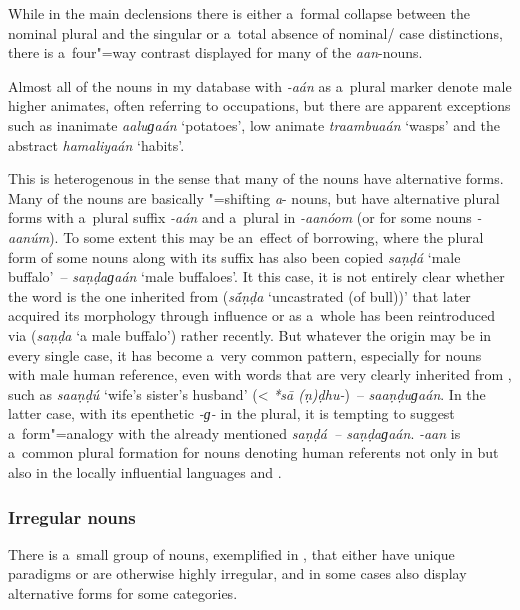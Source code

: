While in the main declensions there is either a~formal collapse between the nominal plural and the  singular or a~total absence of nominal/ case distinctions, there is a~four"=way contrast displayed for many of the \textit{aan}-nouns.


Almost all of the nouns in my database with \textit{-aán} as a~plural marker denote male higher animates, often referring to occupations, but there are apparent exceptions such as inanimate \textit{aaluɡaán} `potatoes', low animate \textit{traambuaán} `wasps' and the abstract  \textit{hamaliyaán} `habits'.


This  is heterogenous in the sense that many of the nouns have alternative forms. Many of
the nouns are basically "=shifting \textit{a}- nouns, but have alternative plural
forms with a~plural suffix \textit{-aán} and a~plural  in
\textit{-aanóom} (or for some nouns \textit{-aanúm}). To some extent
this may be an~effect of borrowing, where the plural form of some  nouns along with its suffix
has also been copied \textit{saṇḍá} `male buffalo'~-- \textit{saṇḍaɡaán} `male
buffaloes'. It this case, it is not entirely clear whether the word is the one inherited from 
(\textit{s\'{\={a}}ṇḍa} `uncastrated (of bull))' that later acquired its morphology through 
influence or as a~whole has been reintroduced via  (\textit{saṇḍa} `a male buffalo') rather
recently. But whatever the origin may be in every single case, it has become a~very common pattern,
especially for nouns with male human reference, even with words that are very clearly inherited from
, such as \textit{saaṇḍú} `wife's sister's husband' ({\textless} \textit{*s\={a}\'{
  }(ṇ)ḍhu-})~-- \textit{saaṇḍuɡaán}. In the latter case, with its epenthetic
\textit{-ɡ-} in the plural, it is tempting to suggest a~form"=analogy with the already
mentioned \textit{saṇḍá~-- saṇḍaɡaán}. \textit{-aan} is a~common plural
formation for nouns denoting human referents not only in  but also in the locally influential
languages  \citep[431]{windfuhrperry2009} and  \citep[221--225]{endresenkristiansen1981}.

\subsubsection*{Irregular nouns}

There is a~small group of nouns, exemplified in , that either have unique paradigms or are otherwise highly irregular, and in some cases also display alternative forms for some categories. 

